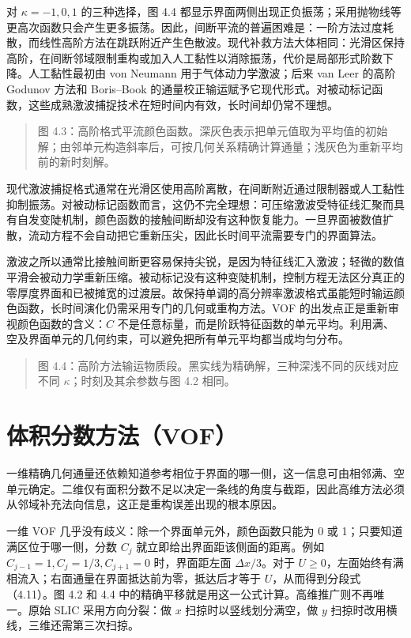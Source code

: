 \documentclass[11pt,a4paper,openany,fontset=none]{ctexbook}
\begin{document}
对 $\kappa=-1,0,1$ 的三种选择，图 4.4 都显示界面两侧出现正负振荡；采用抛物线等更高次函数只会产生更多振荡。因此，间断平流的普遍困难是：一阶方法过度耗散，而线性高阶方法在跳跃附近产生色散波。现代补救方法大体相同：光滑区保持高阶，在间断邻域限制重构或加入人工黏性以消除振荡，代价是局部形式阶数下降。人工黏性最初由 von Neumann 用于气体动力学激波；后来 van Leer 的高阶 Godunov 方法和 Boris--Book 的通量校正输运赋予它现代形式。对被动标记函数，这些成熟激波捕捉技术在短时间内有效，长时间却仍常不理想。

\begin{quote}\small 图 4.3：高阶格式平流颜色函数。深灰色表示把单元值取为平均值的初始解；由邻单元构造斜率后，可按几何关系精确计算通量；浅灰色为重新平均前的新时刻解。\end{quote}
现代激波捕捉格式通常在光滑区使用高阶离散，在间断附近通过限制器或人工黏性抑制振荡。对被动标记函数而言，这仍不完全理想：可压缩激波受特征线汇聚而具有自发变陡机制，颜色函数的接触间断却没有这种恢复能力。一旦界面被数值扩散，流动方程不会自动把它重新压尖，因此长时间平流需要专门的界面算法。

激波之所以通常比接触间断更容易保持尖锐，是因为特征线汇入激波；轻微的数值平滑会被动力学重新压缩。被动标记没有这种变陡机制，控制方程无法区分真正的零厚度界面和已被摊宽的过渡层。故保持单调的高分辨率激波格式虽能短时输运颜色函数，长时间演化仍需采用专门的几何或重构方法。VOF 的出发点正是重新审视颜色函数的含义：$C$ 不是任意标量，而是阶跃特征函数的单元平均。利用满、空及界面单元的几何约束，可以避免把所有单元平均都当成均匀分布。

\begin{quote}\small 图 4.4：高阶方法输运物质段。黑实线为精确解，三种深浅不同的灰线对应不同 $\kappa$；时刻及其余参数与图 4.2 相同。\end{quote}
\section{体积分数方法（VOF）}

一维精确几何通量还依赖知道参考相位于界面的哪一侧，这一信息可由相邻满、空单元确定。二维仅有面积分数不足以决定一条线的角度与截距，因此高维方法必须从邻域补充法向信息，这正是重构误差出现的根本原因。

一维 VOF 几乎没有歧义：除一个界面单元外，颜色函数只能为 0 或 1；只要知道满区位于哪一侧，分数 $C_j$ 就立即给出界面距该侧面的距离。例如 $C_{j-1}=1,C_j=1/3,C_{j+1}=0$ 时，界面距左面 $\Delta x/3$。对于 $U\ge0$，左面始终有满相流入；右面通量在界面抵达前为零，抵达后才等于 $U$，从而得到分段式（4.11）。图 4.2 和 4.4 中的精确平移就是用这一公式计算。高维推广则不再唯一。原始 SLIC 采用方向分裂：做 $x$ 扫掠时以竖线划分满空，做 $y$ 扫掠时改用横线，三维还需第三次扫掠。
\end{document}
